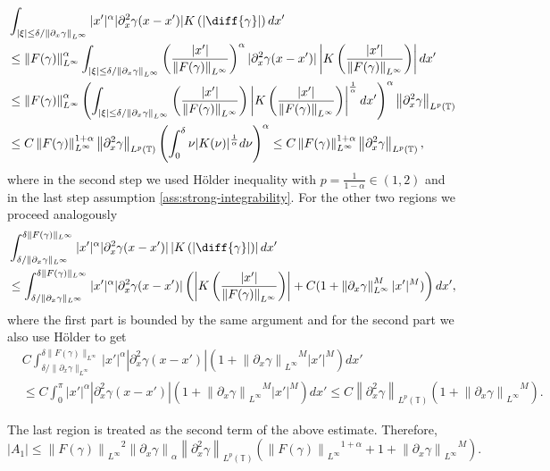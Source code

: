 \documentclass[a4paper]{amsart}
\theoremstyle{definition}
\newcommand{\T}{\ensuremath{\mathbb{T}}}
\newcommand{\Na}[2][\gamma]{\ensuremath{\left\|#2\right\|_{#1}}}
\newcommand{\Np}[2][\infty]{\ensuremath{\left\|#2\right\|_{L^#1}}}
\newcommand{\Lp}[2][2]{\ensuremath{\left\|#2\right\|_{L^#1(\T)}}}
\begin{document}
     \begin{align*}
         &\int_{|\xi| \le \delta/\Np{\partial_x\gamma}} |x'|^\alpha |\partial_x^2\gamma (x-x')|K\left(|\diff{\gamma}|\right)dx'\\
         &\leq \Np{F(\gamma)}^\alpha \int_{|\xi| \le \delta/\Np{\partial_x\gamma}} \left(\frac{|x'|}{\Np{F(\gamma)}}\right)^\alpha |\partial_x^2\gamma (x-x')| \left|K\left(\frac{|x'|}{\Np{F(\gamma)}}\right)\right| dx'
         \\
         &\leq \Np{F(\gamma)}^\alpha \left(\int_{|\xi| \le \delta/\Np{\partial_x\gamma}} \left(\frac{|x'|}{\Np{F(\gamma)}}\right) \left|K\left(\frac{|x'|}{\Np{F(\gamma)}}\right)\right|^{\frac{1}{\alpha}} dx'\right)^{\alpha} \Lp[p]{\partial_x^2 \gamma}
         \\&\leq C \Np{F(\gamma)}^{1+\alpha} \Lp[p]{\partial_x^2 \gamma} \left(\int_0^\delta \nu |K(\nu)|^{\frac{1}{\alpha}} d\nu\right)^{\alpha}\leq C \Np{F(\gamma)}^{1+\alpha} \Lp[p]{\partial_x^2 \gamma},
     \end{align*}
     where in the second step we used Hölder inequality with $p=\frac{1}{1-\alpha}\in(1,2)$ and in the last step assumption \eqref{ass:strong-integrability}. For the other two regions we proceed analogously
     \begin{align*}
         &\int_{\delta/\|\partial_x\gamma\|_{L^\infty}}^{\delta\|F(\gamma)\|_{L^\infty}} |x'|^\alpha |\partial_x^2\gamma (x-x')| \left|K\left(|\diff{\gamma}|\right)\right| dx'\\
         &\leq \int_{\delta/\|\partial_x\gamma\|_{L^\infty}}^{\delta\|F(\gamma)\|_{L^\infty}} |x'|^\alpha |\partial_x^2\gamma (x-x')|\left(\left|K\left(\frac{|x'|}{\Np{F(\gamma)}}\right)\right|+C(1+\Np{\partial_x\gamma}^M|x'|^M)\right)dx',
     \end{align*}
    where the first part is bounded by the same argument and for the second part we also use Hölder to get  
    \begin{align*}
        &C \int_{\delta/\|\partial_x\gamma\|_{L^\infty}}^{\delta\|F(\gamma)\|_{L^\infty}} |x'|^\alpha |\partial_x^2\gamma (x-x')|(1+\Np{\partial_x\gamma}^M|x'|^M)dx' \\&\leq C \int_0^\pi |x'|^\alpha |\partial_x^2\gamma (x-x')|(1+\Np{\partial_x\gamma}^M|x'|^M)dx' \leq C\Lp[p]{\partial_x^2 \gamma}(1+\Np{\partial_x\gamma}^M).
    \end{align*}

    The last region is treated as the second term of the above estimate. Therefore, $$|A_1|\leq\Np{F(\gamma)}^2 \Na[\alpha]{\partial_x\gamma}\Lp[p]{\partial_x^2 \gamma} (\Np{F(\gamma)}^{1+\alpha}+1+\Np{\partial_x\gamma}^M).$$
\end{document}

